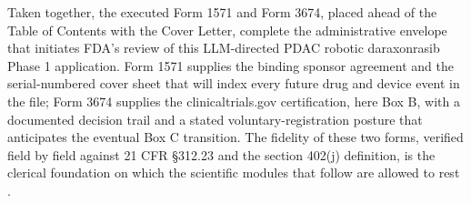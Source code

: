 Taken together, the executed Form 1571 and Form 3674, placed ahead of the
Table of Contents with the Cover Letter, complete the administrative
envelope that initiates FDA's review of this LLM-directed PDAC robotic
daraxonrasib Phase 1 application. Form 1571 supplies the binding sponsor
agreement and the serial-numbered cover sheet that will index every future
drug and device event in the file; Form 3674 supplies the
clinicaltrials.gov certification, here Box B, with a documented decision
trail and a stated voluntary-registration posture that anticipates the
eventual Box C transition. The fidelity of these two forms, verified
field by field against 21 CFR \S 312.23 and the section 402(j) definition,
is the clerical foundation on which the scientific modules that follow are
allowed to rest \cite{phase1guidance, cfr312paiuni, congress9510}.
